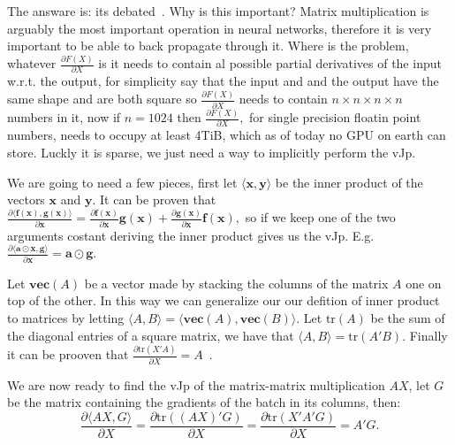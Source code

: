 \documentclass{article}
\newcommand{\trace}{\mathrm{tr}}
\newcommand{\partialfrac}[2]{\frac{\partial #1}{\partial #2}}
\newcommand{\vect}{\mathbf{vec}} %
\newcommand{\hadam}{\odot} %
\renewcommand\vec[1]{\mathbf{#1}}
\begin{document}
The answare is: its debated~\cite{notion}. Why is this important? Matrix multiplication is
arguably the most important operation in neural networks, therefore it is very
important to be able to back propagate through it. Where is the problem,
whatever \(\partialfrac{F(X)}{X}\) is it needs to contain al possible partial
derivatives of the input w.r.t. the output, for simplicity say that the input
and and the output have the same shape and are both square so
\(\partialfrac{F(X)}{X}\) needs to contain \(n \times n \times n \times n\)
numbers in it, now if \(n=1024\) then \(\partialfrac{F(X)}{X},\) for single
precision floatin point numbers, needs to occupy at least 4TiB, which as of
today no GPU on earth can store. Luckly it is sparse, we just need a way to
implicitly perform the vJp.

We are going to need a few pieces, first let \(\langle\vec x,\vec y\rangle\) be
the inner product of the vectors \(\vec x\) and \(\vec y.\) It can be proven
that \(\partialfrac{\langle\vec f(\vec x),\vec g(\vec x)\rangle}{\vec x}
= \partialfrac{\vec f(\vec x)}{\vec x} \vec g(\vec x)
	+ \partialfrac{\vec g(\vec x)}{\vec x} \vec f(\vec x),\) so if we keep one
of the two arguments costant deriving the inner product gives us the vJp. E.g.
\(\partialfrac{\langle\vec a \hadam \vec x,\vec g\rangle}{\vec x}
= \vec a \hadam \vec g.\)

Let \(\vect(A)\) be a vector made by stacking the columns of the matrix \(A\)
one on top of the other. In this way we can generalize our our defition of
inner product to matrices by letting \(\langle A,B\rangle =
\langle\vect(A),\vect(B)\rangle.\) Let \(\trace(A)\) be the sum of the diagonal
entries of a square matrix, we have that \(\langle A,B\rangle = \trace(A'B).\)
Finally it can be prooven that \(\partialfrac{\trace(X'A)}{X} =
A\)~\cite{cookbook,magnus}.

We are now ready to find the vJp of the matrix-matrix multiplication \(A X\),
let \(G\) be the matrix containing the gradients of the batch in its columns,
then: \[
\partialfrac{\langle AX,G\rangle}{X}
= \partialfrac{\trace((AX)'G)}{X}
= \partialfrac{\trace(X'A'G)}{X}
= A'G.\]



\end{document}
